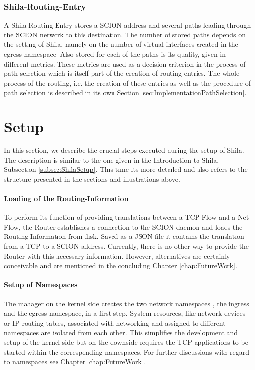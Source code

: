 \subsubsection{Shila-Routing-Entry}

A Shila-Routing-Entry stores a SCION address and several paths leading through the SCION network to this destination. The number of stored paths depends on the setting of Shila, namely on the number of virtual interfaces created in the egress namespace. Also stored for each of the paths is its quality, given in different metrics. These metrics are used as a decision criterion in the process of path selection which is itself part of the creation of routing entries. The whole process of the routing, i.e. the creation of these entries as well as the procedure of path selection is described in its own Section \ref{sec:ImplementationPathSelection}.

\newpage
\section{Setup}
\label{sec:ImplementationSetup}

In this section, we describe the crucial steps executed during the setup of Shila. The description is similar to the one given in the Introduction to Shila, Subsection \ref{subsec:ShilaSetup}. This time its more detailed and also refers to the structure presented in the sections and illustrations above.

\paragraph{Loading of the Routing-Information}

To perform its function of providing translations between a TCP-Flow and a Net-Flow, the Router establishes a connection to the SCION daemon and loads the Routing-Information from disk. Saved as a JSON file it contains the translation from a TCP to a SCION address. Currently, there is no other way to provide the Router with this necessary information. However, alternatives are certainly conceivable and are mentioned in the concluding Chapter \ref{chap:FutureWork}.

\paragraph{Setup of Namespaces}

The manager on the kernel side creates the two network namespaces \cite{LinuxNetworkNamespacesUbuntuManual,LinuxNetworkNamespacesIntroduction}, the ingress and the egress namespace, in a first step. System resources, like network devices or IP routing tables, associated with networking and assigned to different namespaces are isolated from each other. This simplifies the development and setup of the kernel side but on the downside requires the TCP applications to be started within the corresponding namespaces. For further discussions with regard to namespaces see Chapter \ref{chap:FutureWork}.


